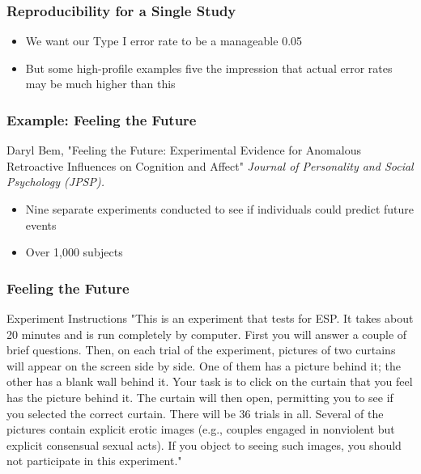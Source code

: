 \documentclass[10pt, block=fill]{beamer}
\begin{document}
\begin{frame}
  \frametitle{Reproducibility for a Single Study}
  
  \begin{itemize}
    \item We want our Type I error rate to be a manageable 0.05
    \item But some high-profile examples five the impression that actual error rates may be much higher than this
  \end{itemize}
    
\end{frame}

\begin{frame}
  \frametitle{Example: Feeling the Future}
  Daryl Bem, "Feeling the Future: Experimental Evidence for Anomalous Retroactive Influences on Cognition and Affect" \textit{Journal of Personality and Social Psychology (JPSP).}
  \begin{itemize}
    \item Nine separate experiments conducted to see if individuals could predict future events
    \item Over 1,000 subjects
  \end{itemize}
\end{frame}

\begin{frame}
  \frametitle{Feeling the Future}

  \begin{block}{Experiment Instructions}
    \footnotesize{"This is an experiment that tests for ESP. It takes about 20 minutes and is run completely by computer. First you will answer a couple of brief questions. Then, on each trial of the experiment, pictures of two curtains will appear on the screen side by side. One of them has a picture behind it; the other has a blank wall behind it. Your task is to click on the curtain that you feel has the picture behind it. The curtain will then open, permitting you to see if you selected the correct curtain. There will be 36 trials in all. Several of the pictures contain explicit erotic images (e.g., couples engaged in nonviolent but explicit consensual sexual acts). If you object to seeing such images, you should not participate in this experiment."}
  \end{block}
\end{frame}
\end{document}

